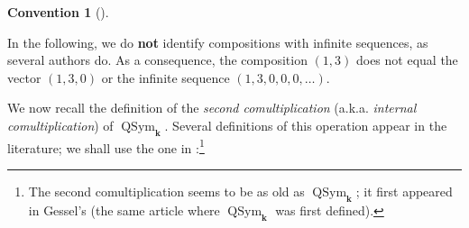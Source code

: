 \documentclass
[numbers=enddot,12pt,final,onecolumn,notitlepage,abstracton]{scrartcl}%
\theoremstyle{definition}
\newtheorem{conv}[theo]{Convention}
\newenvironment{convention}[1][]
{\begin{conv}[#1]\begin{leftbar}}
{\end{leftbar}\end{conv}}
\begin{document}
\begin{convention}
In the following, we do \textbf{not} identify compositions with infinite
sequences, as several authors do. As a consequence, the composition $\left(
1,3\right)  $ does not equal the vector $\left(  1,3,0\right)  $ or the
infinite sequence $\left(  1,3,0,0,0,\ldots\right)  $.
\end{convention}

We now recall the definition of the \textit{second comultiplication} (a.k.a.
\textit{internal comultiplication}) of $\operatorname*{QSym}%
\nolimits_{\mathbf{k}}$. Several definitions of this operation appear in the
literature; we shall use the one in \cite[\S 11.39]{HazeWitt}:\footnote{The
second comultiplication seems to be as old as $\operatorname*{QSym}%
\nolimits_{\mathbf{k}}$; it first appeared in Gessel's \cite[\S 4]{Gessel}
(the same article where $\operatorname*{QSym}\nolimits_{\mathbf{k}}$ was first
defined).}
\end{document}
